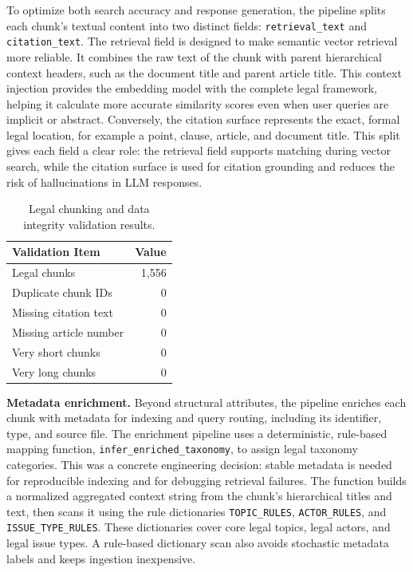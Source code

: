 To optimize both search accuracy and response generation, the pipeline splits each chunk's textual content into two distinct fields: \texttt{retrieval\_text} and \texttt{citation\_text}. The retrieval field is designed to make semantic vector retrieval more reliable. It combines the raw text of the chunk with parent hierarchical context headers, such as the document title and parent article title. This context injection provides the embedding model with the complete legal framework, helping it calculate more accurate similarity scores even when user queries are implicit or abstract. Conversely, the citation surface represents the exact, formal legal location, for example a point, clause, article, and document title. This split gives each field a clear role: the retrieval field supports matching during vector search, while the citation surface is used for citation grounding and reduces the risk of hallucinations in LLM responses.

\begin{table}[H]
  \centering
  \caption{Legal chunking and data integrity validation results.}
  \label{tab:chunking-validation}
  \begin{tabular}{lr}
    \toprule
    Validation Item & Value \\
    \midrule
    Legal chunks & 1,556 \\
    Duplicate chunk IDs & 0 \\
    Missing citation text & 0 \\
    Missing article number & 0 \\
    Very short chunks & 0 \\
    Very long chunks & 0 \\
    \bottomrule
  \end{tabular}
\end{table}

\textbf{Metadata enrichment.} Beyond structural attributes, the pipeline enriches each chunk with metadata for indexing and query routing, including its identifier, type, and source file. The enrichment pipeline uses a deterministic, rule-based mapping function, \texttt{infer\_enriched\_taxonomy}, to assign legal taxonomy categories. This was a concrete engineering decision: stable metadata is needed for reproducible indexing and for debugging retrieval failures. The function builds a normalized aggregated context string from the chunk's hierarchical titles and text, then scans it using the rule dictionaries \texttt{TOPIC\_RULES}, \texttt{ACTOR\_RULES}, and \texttt{ISSUE\_TYPE\_RULES}. These dictionaries cover core legal topics, legal actors, and legal issue types. A rule-based dictionary scan also avoids stochastic metadata labels and keeps ingestion inexpensive.

